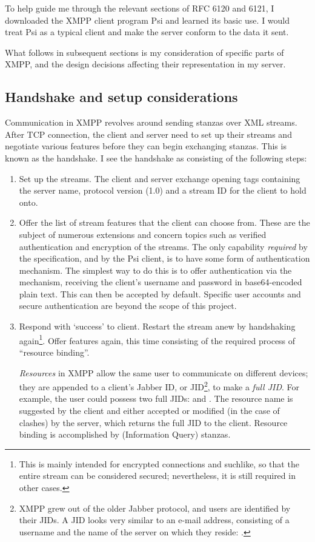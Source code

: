 \documentclass[12pt,a4paper,twoside,openright]{report}
\begin{document}
{To help guide me through the relevant sections of RFC 6120 and 6121, I downloaded the XMPP client program Psi\cite{Psi-IM} and learned its basic use. I would treat Psi as a typical client and make the server conform to the data it sent.

What follows in subsequent sections is my consideration of specific parts of XMPP, and the design decisions affecting their representation in my server.

\subsection{Handshake and setup considerations}
Communication in XMPP revolves around sending stanzas over XML streams. After TCP connection, the client and server need to set up their streams and negotiate various features before they can begin exchanging stanzas. This is known as the handshake. I see the handshake as consisting of the following steps:
\begin{enumerate}
  \item Set up the streams. The client and server exchange  opening tags containing the server name, protocol version (1.0) and a stream ID for the client to hold onto.

  \item Offer the list of stream features that the client can choose from. These are the subject of numerous extensions and concern topics such as verified authentication and encryption of the streams. The only capability \emph{required} by the specification, and by the Psi client, is to have some form of authentication mechanism. The simplest way to do this is to offer authentication via the  mechanism, receiving the client's username and password in base64-encoded plain text. This can then be accepted by default. Specific user accounts and secure authentication are beyond the scope of this project.

  \item Respond with `success' to client. Restart the stream anew by handshaking again\footnote{This is mainly intended for encrypted connections and suchlike, so that the entire stream can be considered secured; nevertheless, it is still required in other cases.}. Offer features again, this time consisting of the required process of ``resource binding''.

  \emph{Resources} in XMPP allow the same user to communicate on different devices; they are appended to a client's Jabber ID, or JID\footnote{XMPP grew out of the older Jabber protocol, and users are identified by their JIDs. A JID looks very similar to an e-mail address, consisting of a username and the name of the server on which they reside: .}, to make a \emph{full JID}. For example, the user  could possess two full JIDs:  and . The resource name is suggested by the client and either accepted or modified (in the case of clashes) by the server, which returns the full JID to the client. Resource binding is accomplished by  (Information Query) stanzas.


\end{enumerate}}
\end{document}
